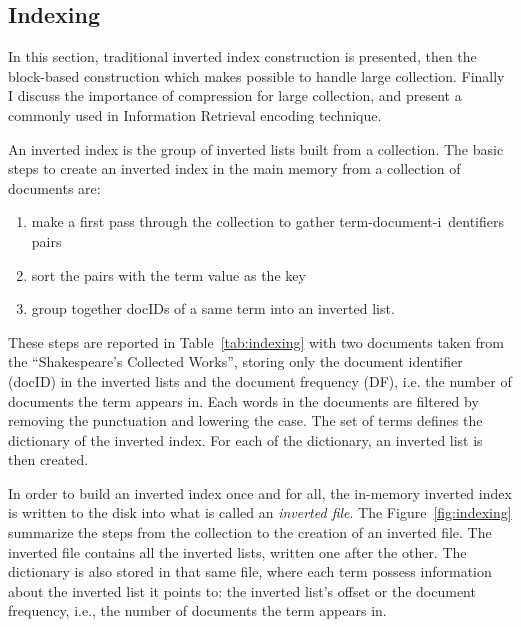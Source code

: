 \subsection{Indexing}
\label{sec:IR-indexing}

In this section, traditional inverted index construction is presented, then the
block-based construction which makes possible to handle large collection.
Finally I discuss the importance of compression for large collection, and
present a commonly used  in Information Retrieval encoding technique.

An inverted index is the group of inverted lists built from a collection.
The basic steps to create an inverted index in the main memory from a collection
of documents are:
\begin{enumerate}
  \item make a first pass through the collection to gather term-document-i~dentifiers pairs
  \item sort the pairs with the term value as the key
  \item group together docIDs of a same term into an inverted list.
\end{enumerate}
These steps are reported in Table~\ref{tab:indexing} with two documents taken
from the ``Shakespeare's Collected Works'', storing only the document
identifier (docID) in the inverted lists and the document frequency (DF), i.e.
the number of documents the term appears in. Each words in the documents are
filtered by removing the punctuation and lowering the case. The set of terms
defines the dictionary of the inverted index. For each of the dictionary, an
inverted list is then created.

In order to build an inverted index once and for all, the in-memory
inverted index is written to the disk into what is called an \emph{inverted
file}. The Figure~\ref{fig:indexing} summarize the steps from the
collection to the creation of an inverted file. The inverted file contains all
the inverted lists, written one after the other. The dictionary is also stored
in that same file, where each term possess information about the inverted list
it points to: the inverted list's offset or the document frequency, i.e., the
number of documents the term appears in.


